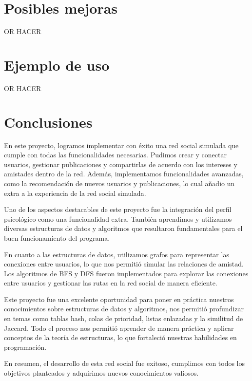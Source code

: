\documentclass[9pt,letterpaper,onecolumn]{rho-class/rho}
\begin{document}
\section{Posibles mejoras}

    OR HACER

\section{Ejemplo de uso}

    OR HACER

\section{Conclusiones}

    En este proyecto, logramos implementar con éxito una red social simulada que cumple con todas las funcionalidades necesarias. Pudimos crear y conectar usuarios, gestionar publicaciones y compartirlas de acuerdo con los intereses y amistades dentro de la red. Además, implementamos funcionalidades avanzadas, como la recomendación de nuevos usuarios y publicaciones, lo cual añadio un extra a la experiencia de la red social simulada.

    Uno de los aspectos destacables de este proyecto fue la integración del perfil psicológico como una funcionalidad extra. También aprendimos y utilizamos diversas estructuras de datos y algoritmos que resultaron fundamentales para el buen funcionamiento del programa.

    En cuanto a las estructuras de datos, utilizamos grafos para representar las conexiones entre usuarios, lo que nos permitió simular las relaciones de amistad. Los algoritmos de BFS y DFS fueron implementados para explorar las conexiones entre usuarios y gestionar las rutas en la red social de manera eficiente.

    Este proyecto fue una excelente oportunidad para poner en práctica nuestros conocimientos sobre estructuras de datos y algoritmos, nos permitió profundizar en temas como tablas hash, colas de prioridad, listas enlazadas y la similitud de Jaccard. Todo el proceso nos permitió aprender de manera práctica y aplicar conceptos de la teoría de estructuras, lo que fortaleció nuestras habilidades en programación.

    En resumen, el desarrollo de esta red social fue exitoso, cumplimos con todos los objetivos planteados y adquirimos nuevos conocimientos valiosos.
\end{document}
